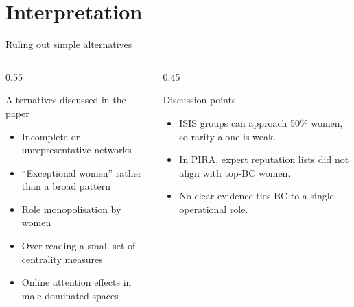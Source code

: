 \section{Interpretation}

\begin{frame}{Ruling out simple alternatives}
  \small
  \begin{columns}[T,onlytextwidth]
    \begin{column}{0.55\textwidth}
      \begin{block}{Alternatives discussed in the paper}
        \begin{itemize}
          \item Incomplete or unrepresentative networks
          \item “Exceptional women” rather than a broad pattern
          \item Role monopolisation by women
          \item Over-reading a small set of centrality measures
          \item Online attention effects in male-dominated spaces
        \end{itemize}
      \end{block}
    \end{column}

    \begin{column}{0.45\textwidth}
      \begin{exampleblock}{Discussion points}
        \begin{itemize}
          \item ISIS groups can approach 50\% women, so rarity alone is weak.
          \item In PIRA, expert reputation lists did not align with top-BC women.
          \item No clear evidence ties BC to a single operational role.
        \end{itemize}
      \end{exampleblock}
    \end{column}
  \end{columns}

\end{frame}

